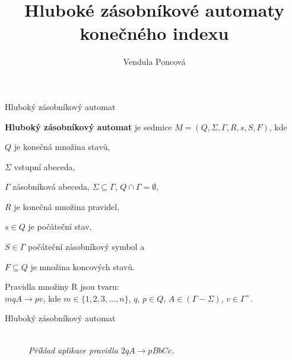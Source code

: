 \documentclass[a4paper,fyma3]{prosper}
\title{Hluboké zásobníkové automaty
	konečného indexu}
\author{Vendula Poncová}
\theoremstyle{definition}
\begin{document}

\maketitle





\begin{slide}{Hluboký zásobníkový automat}

\bigskip

\textbf{Hluboký zásobníkový automat} je sedmice $M = (Q,\Sigma,\Gamma, R, s, S, F)$, kde 
\begin{description*}
 \item[$Q$] je konečná množina stavů, 
 \item[$\Sigma$] vstupní abeceda, 
 \item[$\Gamma$] zásobníková abeceda, $\Sigma \subseteq \Gamma$, $Q \cap \Gamma = \emptyset$,
 \item[$R$] je konečná množina pravidel,
 \item[$s \in Q$] je počáteční stav, 
 \item[$S \in \Gamma$] počáteční zásobníkový symbol a 
 \item[$F \subseteq Q$] je množina koncových stavů.
\end{description*}
\bigskip
Pravidla množiny R jsou tvaru: \\$mqA \rightarrow pv$, kde $m \in \{1, 2, 3,\dots, n\}$, $q$, $p \in Q$, $A \in (\Gamma-\Sigma)$, $v \in {\Gamma}^+$.

\end{slide}
\begin{slide}{Hluboký zásobníkový automat}

\bigskip
\bigskip
\bigskip

\begin{figure}[h!]
\centering
{} \bigskip \\
\emph{Příklad aplikace pravidla $2 q A \rightarrow p BbCc$.}
\end{figure}


\end{slide}
\end{document}
